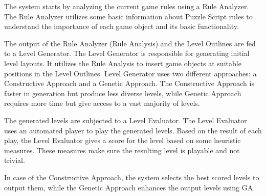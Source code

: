 \documentclass[letterpaper]{article}
\begin{document}
The system starts by analyzing the current game rules using a Rule Analyzer. The Rule Analyzer utilizes some basic information about Puzzle Script rules to understand the importance of each game object and its basic functionality.\\\par

The output of the Rule Analyzer (Rule Analysis) and the Level Outlines are fed to a Level Generator. The Level Generator is responsible for generating initial level layouts. It utilizes the Rule Analysis to insert game objects at suitable positions in the Level Outlines. Level Generator uses two different approaches: a Constructive Approach and a Genetic Approach. The Constructive Approach is faster in generation but produce less diverse levels, while Genetic Approach requires more time but give access to a vast majority of levels.\\\par

The generated levels are subjected to a Level Evaluator. The Level Evaluator uses an automated player to play the generated levels. Based on the result of each play, the Level Evaluator gives a score for the level based on some heuristic measures. These measures make sure the resulting level is playable and not trivial.\\\par

In case of the Constructive Approach, the system selects the best scored levels to output them, while the Genetic Approach enhances the output levels using GA.
\end{document}
